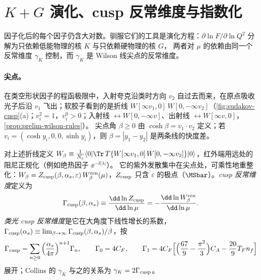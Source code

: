 \section{\texorpdfstring{$K+G$}{K+G} 演化、cusp 反常维度与指数化}\label{sec:sudakov-evolution}

因子化后的每个因子仍含大对数。驯服它们的工具是演化方程：$\partial\ln F/\partial\ln Q^2$ 分解为只依赖低能物理的核 $K$ 与只依赖硬物理的核 $G$，
两者对 $\mu$ 的依赖由同一个反常维度 $\gamma_K$ 控制，而 $\gamma_K$ 是 Wilson 线尖点的反常维度。

\paragraph{尖点。}在类空形状因子的程函极限中，入射夸克沿类时方向 $v_2$ 自过去而来，在原点吸收光子后沿 $v_1$ 飞出；软胶子看到的是折线
$W[\infty v_1,0]\,W[0,-\infty v_2]$（\cref{fig:sudakov-cusp}(a)；$v_i^2=1$，$v_i^0>0$；入射线 $\leftrightarrow W[0,-\infty v]$、出射线 $\leftrightarrow W[\infty v,0]$，\cref{prop:prelim-wilson-rules}）。
尖点角 $\beta\ge0$ 由 $\cosh\beta=v_1\cdot v_2$ 定义；若 $v_i=(\cosh y_i,0,0,\sinh y_i)$，则 $\beta=|y_1-y_2|$ 是两条线的快度差。

\begin{definition}\label{def:sudakov-cusp}
对上述折线定义 $W_\beta\equiv\frac1{N_c}\langle0|\Tr\,T\{W[\infty v_1,0]\,W[0,-\infty v_2]\}|0\rangle$，红外端用远处的阻尼正规化（例如绝热因子 $\ee^{-\delta|\lambda|}$）。
它的紫外发散集中在尖点处，可乘性地重整化：$W_\beta=Z_{\rm cusp}(\beta,\alpha_s,\varepsilon)\,W_\beta^{\rm ren}(\mu)$，$Z_{\rm cusp}$ 只含 $\varepsilon$ 的极点（$\MSbar$）。\emph{cusp 反常维度}定义为
\begin{equation}\label{eq:sudakov-cusp-def}
\Gamma_{\rm cusp}(\beta,\alpha_s)\equiv\frac{\dd\ln Z_{\rm cusp}}{\dd\ln\mu}=-\frac{\dd\ln W_\beta^{\rm ren}}{\dd\ln\mu} .
\end{equation}
\emph{类光 cusp 反常维度}是它在大角度下线性增长的系数，$\Gamma_{\rm cusp}(\alpha_s)\equiv\lim_{\beta\to\infty}\Gamma_{\rm cusp}(\beta,\alpha_s)/\beta$，按
\begin{equation}\label{eq:sudakov-cusp-series}
\Gamma_{\rm cusp}=\sum_{n\ge0}\Big(\frac{\alpha_s}{4\pi}\Big)^{n+1}\Gamma_n,\qquad \Gamma_0=4C_F,\qquad
\Gamma_1=4C_F\Big[\Big(\frac{67}9-\frac{\pi^2}3\Big)C_A-\frac{20}9T_Fn_f\Big]
\end{equation}
展开；Collins 的 $\gamma_K$ 与之的关系为 $\gamma_K=2\Gamma_{\rm cusp}$。
\end{definition}

